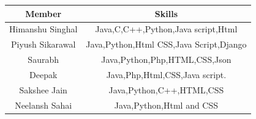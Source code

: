 \documentclass[12pt]{article}
\begin{document}
\begin{center}
		\begin{tabular}{ | c | c |}
			\hline
			Member & Skills       \\
			\hline
			Himanshu Singhal   & Java,C,C++,Python,Java script,Html \\
			
		    Piyush Sikarawal    &  Java,Python,Html CSS,Java Script,Django
                             \\ 
			
		Saurabh    &  Java,Python,Php,HTML,CSS,Json
                            \\ 
			
		Deepak  & Java,Php,Html,CSS,Java script.                           
                           \\ 
			
		Sakshee Jain        &  Java,Python,C++,HTML,CSS
                        \\ 
			
			
		Neelansh Sahai        &  Java,Python,Html and CSS \\ 
			
			\hline
			
		\end{tabular}
		

	\end{center}
	\newpage
	        
\end{document}
